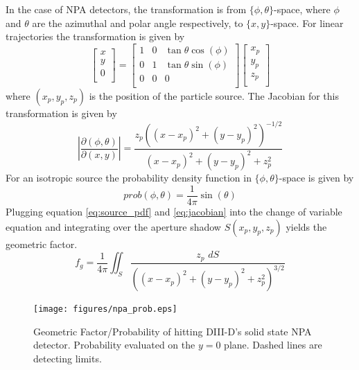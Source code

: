 In the case of NPA detectors, the transformation is from $\{\phi,\theta\}$-space, where $\phi$ and $\theta$ are the azimuthal and polar angle respectively, to $\{x,y\}$-space. For linear trajectories the transformation is given by
\begin{equation}
\label{eq:matrix_transform}
\begin{bmatrix}
	x \\
	y \\
	0 \\
\end{bmatrix}
=
\begin{bmatrix}
	1 & 0 & \tan{\theta}\cos(\phi)\\
	0 & 1 & \tan{\theta}\sin(\phi)\\
	0 & 0 & 0\\
\end{bmatrix}
\begin{bmatrix}
	x_p \\
	y_p \\
	z_p \\
\end{bmatrix}
\end{equation}
where $(x_p,y_p,z_p)$ is the position of the particle source. The Jacobian for this transformation is given by
\begin{equation}
\label{eq:jacobian}
\left | \frac{\partial(\phi,\theta)}{\partial(x,y)} \right| = \frac{z_p ((x-x_p)^2 + (y-y_p)^2)^{-1/2}}{(x-x_p)^2 + (y-y_p)^2 + z_p^2}
\end{equation}
For an isotropic source the probability density function in $\{\phi,\theta\}$-space is given by 
\begin{equation}
\label{eq:source_pdf}
prob(\phi,\theta) = \frac{1}{4\pi} \sin(\theta)
\end{equation}
Plugging equation \ref{eq:source_pdf} and \ref{eq:jacobian} into the change of variable equation and integrating over the aperture shadow $S(x_p,y_p,z_p)$ yields the geometric factor.
\begin{equation}
\label{eq:prob_geo}
f_g = \frac{1}{4\pi}\iint_S\frac{z_p\,\, dS}{((x-x_p)^2 + (y-y_p)^2 + z_p^2)^{3/2}}
\end{equation}
\begin{figure}[h!]
    \centering
    \texttt{[image: figures/npa\_prob.eps]}
    \caption{Geometric Factor/Probability of hitting DIII-D's solid state NPA detector. Probability evaluated on the $y=0$ plane. Dashed lines are detecting limits.}
    \label{fig:npa_prob}
\end{figure}

